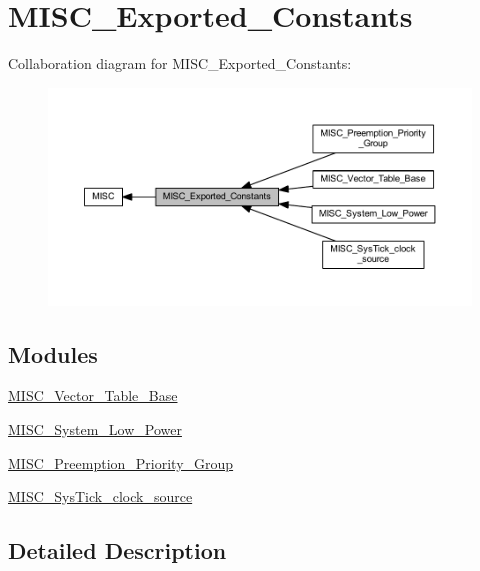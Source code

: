 \hypertarget{group___m_i_s_c___exported___constants}{}\section{M\+I\+S\+C\+\_\+\+Exported\+\_\+\+Constants}
\label{group___m_i_s_c___exported___constants}
Collaboration diagram for M\+I\+S\+C\+\_\+\+Exported\+\_\+\+Constants\+:\nopagebreak
\begin{figure}[H]
\begin{center}
\leavevmode
\includegraphics[width=350pt]{group___m_i_s_c___exported___constants}
\end{center}
\end{figure}
\subsection*{Modules}
\begin{DoxyCompactItemize}
\item 
\hyperlink{group___m_i_s_c___vector___table___base}{M\+I\+S\+C\+\_\+\+Vector\+\_\+\+Table\+\_\+\+Base}
\item 
\hyperlink{group___m_i_s_c___system___low___power}{M\+I\+S\+C\+\_\+\+System\+\_\+\+Low\+\_\+\+Power}
\item 
\hyperlink{group___m_i_s_c___preemption___priority___group}{M\+I\+S\+C\+\_\+\+Preemption\+\_\+\+Priority\+\_\+\+Group}
\item 
\hyperlink{group___m_i_s_c___sys_tick__clock__source}{M\+I\+S\+C\+\_\+\+Sys\+Tick\+\_\+clock\+\_\+source}
\end{DoxyCompactItemize}


\subsection{Detailed Description}
